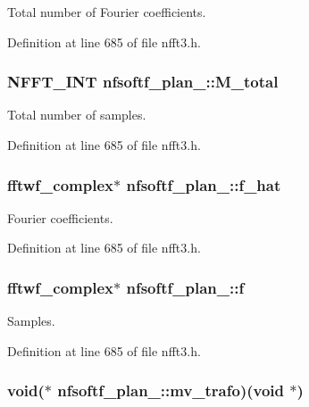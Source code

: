 Total number of Fourier coefficients. 



Definition at line 685 of file nfft3.\-h.

\hypertarget{structnfsoftf__plan___a1085539641dbe2980ff89c632a7994eb}{
\subsubsection[{M\-\_\-total}]{\setlength{\rightskip}{0pt plus 5cm}N\-F\-F\-T\-\_\-\-I\-N\-T nfsoftf\-\_\-plan\-\_\-\-::\-M\-\_\-total}}\label{structnfsoftf__plan___a1085539641dbe2980ff89c632a7994eb}


Total number of samples. 



Definition at line 685 of file nfft3.\-h.

\hypertarget{structnfsoftf__plan___aa6990fedf1965a967f3f718dd373f543}{
\subsubsection[{f\-\_\-hat}]{\setlength{\rightskip}{0pt plus 5cm}fftwf\-\_\-complex$\ast$ nfsoftf\-\_\-plan\-\_\-\-::f\-\_\-hat}}\label{structnfsoftf__plan___aa6990fedf1965a967f3f718dd373f543}


Fourier coefficients. 



Definition at line 685 of file nfft3.\-h.

\hypertarget{structnfsoftf__plan___a165dc6360c20f9eb19a55872cc29455a}{
\subsubsection[{f}]{\setlength{\rightskip}{0pt plus 5cm}fftwf\-\_\-complex$\ast$ nfsoftf\-\_\-plan\-\_\-\-::f}}\label{structnfsoftf__plan___a165dc6360c20f9eb19a55872cc29455a}


Samples. 



Definition at line 685 of file nfft3.\-h.

\hypertarget{structnfsoftf__plan___a0291622a1f08aff56cc126ca64364d85}{
\subsubsection[{mv\-\_\-trafo}]{\setlength{\rightskip}{0pt plus 5cm}void($\ast$ nfsoftf\-\_\-plan\-\_\-\-::mv\-\_\-trafo)(void $\ast$)}}\label{structnfsoftf__plan___a0291622a1f08aff56cc126ca64364d85}


